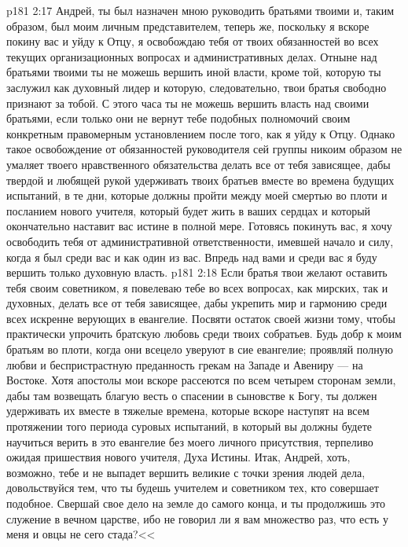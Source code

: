 \vs p181 2:17 Андрей, ты был назначен мною руководить братьями твоими и, таким образом, был моим личным представителем, теперь же, поскольку я вскоре покину вас и уйду к Отцу, я освобождаю тебя от твоих обязанностей во всех текущих организационных вопросах и административных делах. Отныне над братьями твоими ты не можешь вершить иной власти, кроме той, которую ты заслужил как духовный лидер и которую, следовательно, твои братья свободно признают за тобой. С этого часа ты не можешь вершить власть над своими братьями, если только они не вернут тебе подобных полномочий своим конкретным правомерным установлением после того, как я уйду к Отцу. Однако такое освобождение от обязанностей руководителя сей группы никоим образом не умаляет твоего нравственного обязательства делать все от тебя зависящее, дабы твердой и любящей рукой удерживать твоих братьев вместе во времена будущих испытаний, в те дни, которые должны пройти между моей смертью во плоти и посланием нового учителя, который будет жить в ваших сердцах и который окончательно наставит вас истине в полной мере. Готовясь покинуть вас, я хочу освободить тебя от административной ответственности, имевшей начало и силу, когда я был среди вас и как один из вас. Впредь над вами и среди вас я буду вершить только духовную власть.
\vs p181 2:18 Если братья твои желают оставить тебя своим советником, я повелеваю тебе во всех вопросах, как мирских, так и духовных, делать все от тебя зависящее, дабы укрепить мир и гармонию среди всех искренне верующих в евангелие. Посвяти остаток своей жизни тому, чтобы практически упрочить братскую любовь среди твоих собратьев. Будь добр к моим братьям во плоти, когда они всецело уверуют в сие евангелие; проявляй полную любви и беспристрастную преданность грекам на Западе и Авениру --- на Востоке. Хотя апостолы мои вскоре рассеются по всем четырем сторонам земли, дабы там возвещать благую весть о спасении в сыновстве к Богу, ты должен удерживать их вместе в тяжелые времена, которые вскоре наступят на всем протяжении того периода суровых испытаний, в который вы должны будете научиться верить в это евангелие без моего личного присутствия, терпеливо ожидая пришествия нового учителя, Духа Истины. Итак, Андрей, хоть, возможно, тебе и не выпадет вершить великие с точки зрения людей дела, довольствуйся тем, что ты будешь учителем и советником тех, кто совершает подобное. Свершай свое дело на земле до самого конца, и ты продолжишь это служение в вечном царстве, ибо не говорил ли я вам множество раз, что есть у меня и овцы не сего стада?<<
